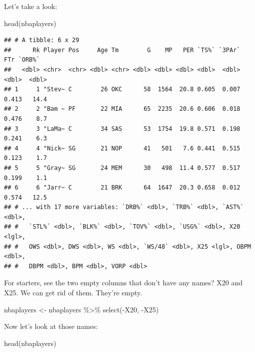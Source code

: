 \documentclass[
]{book}
\newenvironment{Shaded}{\begin{snugshade}}{\end{snugshade}}
\newcommand{\FunctionTok}[1]{\textcolor[rgb]{0.00,0.00,0.00}{#1}}
\newcommand{\NormalTok}[1]{#1}
\newcommand{\OtherTok}[1]{\textcolor[rgb]{0.56,0.35,0.01}{#1}}
\newcommand{\SpecialCharTok}[1]{\textcolor[rgb]{0.00,0.00,0.00}{#1}}
\begin{document}
Let's take a look:

\begin{Shaded}
\begin{Highlighting}[]
\FunctionTok{head}\NormalTok{(nbaplayers)}
\end{Highlighting}
\end{Shaded}

\begin{verbatim}
## # A tibble: 6 x 29
##      Rk Player Pos     Age Tm        G    MP   PER `TS%` `3PAr`   FTr `ORB%`
##   <dbl> <chr>  <chr> <dbl> <chr> <dbl> <dbl> <dbl> <dbl>  <dbl> <dbl>  <dbl>
## 1     1 "Stev~ C        26 OKC      58  1564  20.8 0.605  0.007 0.413   14.4
## 2     2 "Bam ~ PF       22 MIA      65  2235  20.6 0.606  0.018 0.476    8.7
## 3     3 "LaMa~ C        34 SAS      53  1754  19.8 0.571  0.198 0.241    6.3
## 4     4 "Nick~ SG       21 NOP      41   501   7.6 0.441  0.515 0.123    1.7
## 5     5 "Gray~ SG       24 MEM      30   498  11.4 0.577  0.517 0.199    1.1
## 6     6 "Jarr~ C        21 BRK      64  1647  20.3 0.658  0.012 0.574   12.5
## # ... with 17 more variables: `DRB%` <dbl>, `TRB%` <dbl>, `AST%` <dbl>,
## #   `STL%` <dbl>, `BLK%` <dbl>, `TOV%` <dbl>, `USG%` <dbl>, X20 <lgl>,
## #   OWS <dbl>, DWS <dbl>, WS <dbl>, `WS/48` <dbl>, X25 <lgl>, OBPM <dbl>,
## #   DBPM <dbl>, BPM <dbl>, VORP <dbl>
\end{verbatim}

For starters, see the two empty columns that don't have any names? X20 and X25. We can get rid of them. They're empty.

\begin{Shaded}
\begin{Highlighting}[]
\NormalTok{nbaplayers }\OtherTok{\textless{}{-}}\NormalTok{ nbaplayers }\SpecialCharTok{\%\textgreater{}\%} \FunctionTok{select}\NormalTok{(}\SpecialCharTok{{-}}\NormalTok{X20, }\SpecialCharTok{{-}}\NormalTok{X25)}
\end{Highlighting}
\end{Shaded}

Now let's look at those names:

\begin{Shaded}
\begin{Highlighting}[]
\FunctionTok{head}\NormalTok{(nbaplayers)}
\end{Highlighting}
\end{Shaded}
\end{document}
